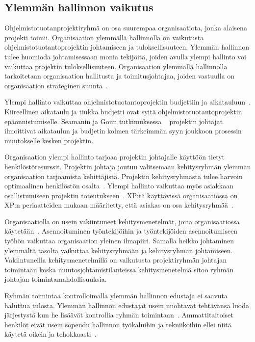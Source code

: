 \documentclass[finnish]{tktltiki2}
\theoremstyle{definition}
\theoremstyle{remark}
\begin{document}
\subsection{Ylemmän hallinnon vaikutus}

Ohjelmistotuotanprojektiryhmä on osa suurempaa organisaatiota, jonka alaisena projekti toimii. Organisaation ylemmällä hallinnolla on vaikutusta ohjelmistotuotantoprojektin johtamiseen ja tuloksellisuuteen. Ylemmän hallinnon tulee huomioda johtamisessaan monia tekijöitä, joiden avulla ylempi hallinto voi vaikuttaa projektin tuloksellisuuteen. Organisaation ylemmällä hallinnolla tarkoitetaan organisaation hallitusta ja toimitusjohtajaa, joiden vastuulla on organisaation strateginen suunta~\cite{McLeod:2011:FAS:1978802.1978803}.

Ylempi hallinto vaikuttaa ohjelmistotuotantoprojektin budjettiin ja aikatauluun~\cite{McLeod:2011:FAS:1978802.1978803}. Kiireellinen aikataulu ja tiukka budjetti ovat syitä ohjelmistotuotantoprojektin epäonnistumiselle. Seamanin ja Goun tutkimuksessa ~\cite{Guo:2008:SSP:1414004.1414046} projektin johtajat ilmoittivat aikataulun ja budjetin kolmen tärkeimmän syyn joukkoon prosessin muutokselle kesken projektin.

Organisaation ylempi hallinto tarjoaa projektin johtajalle käyttöön tietyt henkilöstöresurssit. Projektin johtaja joutuu valitsemaan kehitysryhmän ylemmän organisaation tarjoamista kehittäjistä. Projektin kehitysryhmästä tulee harvoin optimaalinen henkilöstön osalta~\cite{Dhomne:2012:ITL:2382887.2382899}. Ylempi hallinto vaikuttaa myös asiakkaan osallistumiseen projektin toteutukseen~\cite{McLeod:2011:FAS:1978802.1978803}. XP:tä käyttävissä organisaatiossa on XP:n periaatteiden mukaan määritetty, että asiakas on osa kehitysryhmää~\cite{796139}.

Organisaatiolla on usein vakiintuneet kehitysmenetelmät, joita organisaatiossa käytetään~\cite{McLeod:2011:FAS:1978802.1978803}. Asennoituminen työntekijöihin ja työntekijöiden asennoitumiseen työhön vaikuttaa organisaation yleinen ilmapiiri. Samalla heikko johtaminen ylemmältä tasolta vaikuttaa kehitysryhmään ja kehitysryhmän johtamiseen. Vakiintuneilla kehitysmenetelmillä on vaikutusta projektiryhmän johtajan toimintaan koska muutosjohtamistilanteissa kehitysmenetelmä sitoo ryhmän johtajan toimintamahdollisuuksia.

Ryhmän toimintaa kontrolloimalla ylemmän hallinnon edustaja ei saavuta haluttua tulosta. Ylemmän hallinnon edustajat usein unohtavat tehtävänsä luoda järjestystä kun he lisäävät kontrollia ryhmän toimintaan~\cite{Augustine:2005:APM:1101779.1101781}. Ammattitaitoiset henkilöt eivät usein sopeudu hallinnon työkaluihin ja tekniikoihin ellei niitä käytetä oikein ja tehokkaasti~\cite{Augustine:2005:APM:1101779.1101781}.
\end{document}
